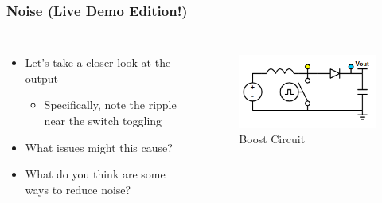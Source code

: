 \documentclass{beamer}
\begin{document}
\begin{frame}
\frametitle{Noise {\small (Live Demo Edition!)}}
\begin{columns}[t]
\begin{itemize}
  \item Let's take a closer look at the output
  \begin{itemize}
    \item Specifically, note the ripple near the switch toggling
  \end{itemize}
  \item What issues might this cause?
  \item What do you think are some ways to reduce noise?
\end{itemize}

\begin{figure}
  \centering
  \includegraphics[scale=0.33]{images-dis4/smps-boost-probed} \\
  Boost Circuit
\end{figure}
\end{columns}
\end{frame}
\end{document}
